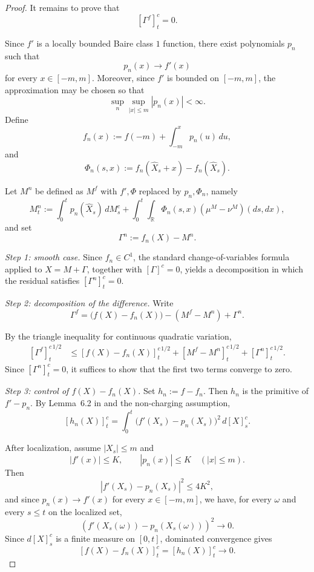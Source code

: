 \documentclass[a4paper,10pt]{article}
\begin{document}
\begin{proof}
It remains to prove that
\[
        [\Gamma^f]^c_t=0.
\]

Since \(f'\) is a locally bounded Baire class \(1\) function, there
exist polynomials \(p_n\) such that
\[
        p_n(x)\to f'(x)
\]
for every \(x\in[-m,m]\).
Moreover, since \(f'\) is bounded on \([-m,m]\), the approximation may
be chosen so that
\[
        \sup_n\sup_{|x|\le m}|p_n(x)|<\infty.
\]
Define
\[
        f_n(x):=f(-m)+\int_{-m}^x p_n(u)\,du,
\]
and
\[
        \Phi_n(s,x):=f_n(\widehat X_s+x)-f_n(\widehat X_s).
\]

Let \(M^n\) be defined as \(M^f\) with \(f',\Phi\) replaced by
\(p_n,\Phi_n\), namely
\[
        M^n_t
        :=
        \int_0^t p_n(\widehat X_s)\,dM^c_s
        +
        \int_0^t\int_{\mathbb R}
        \Phi_n(s,x)(\mu^M-\nu^M)(ds,dx),
\]
and set
\[
        \Gamma^n:=f_n(X)-M^n.
\]

\medskip

\textit{Step 1: smooth case.}
Since \(f_n\in C^1\), the standard change-of-variables formula applied to
\(X=M+\Gamma\), together with \([\Gamma]^c=0\), yields a decomposition
in which the residual satisfies
$
        [\Gamma^n]^c_t=0.
$

\medskip

\textit{Step 2: decomposition of the difference.}
Write
\[
        \Gamma^f
        =
        \bigl(f(X)-f_n(X)\bigr)
        -
        (M^f-M^n)
        +
        \Gamma^n.
\]

By the triangle inequality for continuous quadratic variation,
\[
\begin{aligned}
[\Gamma^f]_t^{c\,1/2}
&\le
[f(X)-f_n(X)]_t^{c\,1/2}
+
[M^f-M^n]_t^{c\,1/2}
+
[\Gamma^n]_t^{c\,1/2}.
\end{aligned}
\]
Since \([\Gamma^n]^c_t=0\), it suffices to show that the first two terms
converge to zero.

\medskip

\textit{Step 3: control of \(f(X)-f_n(X)\).}
Set \(h_n:=f-f_n\). Then \(h_n\) is the primitive of \(f'-p_n\).
By Lemma~6.2 in \cite{Collectanea} and the non-charging assumption,
\[
[h_n(X)]^c_t
=
\int_0^t
\bigl(f'(X_s)-p_n(X_s)\bigr)^2\,d[X]^c_s.
\]

After localization, assume \(|X_s|\le m\) and
\[
|f'(x)|\le K,
\qquad
|p_n(x)|\le K
\quad (|x|\le m).
\]
Then
\[
|f'(X_s)-p_n(X_s)|^2 \le 4K^2,
\]
and since \(p_n(x)\to f'(x)\) for every \(x\in[-m,m]\), we have, for
every \(\omega\) and every \(s\le t\) on the localized set,
\[
        (f'(X_s(\omega))-p_n(X_s(\omega)))^2\to0.
\]
Since \(d[X]^c_s\) is a finite measure on \([0,t]\), dominated convergence
gives
\[
        [f(X)-f_n(X)]^c_t=[h_n(X)]^c_t\longrightarrow0.
\]


\end{proof}
\end{document}
